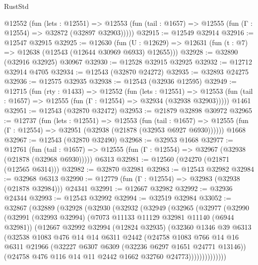 \begin{lexlean}{RustStd}
\begin{coremodule}
    @12552
      (fun (lets : @12551) =>
      @12553 (fun (tail : @1657) => @12555 (fun (Γ : @12554) => @32872 (@32897 @32903)))))
@32915 := @12549 @32914
@32916 := @12547 @32915
@32925 := @12630
    (fun (U : @12629) => @12631 (fun (t : @7) => @12638 (@12543 (@12644 @30969 @6933) @12655)))
@32928 := @32890 (@32916 @32925) @30967
@32930 := @12528 @32915 @32925
@32932 := @12712 @32914 @4705
@32934 := @12543 (@32870 @24272)
@32935 := @32893 @24275
@32936 := @12575 @32935
@32938 := @12543 (@32936 @12595)
@32949 := @12715
    (fun (rty : @1433) =>
    @12552
      (fun (lets : @12551) =>
      @12553 (fun (tail : @1657) => @12555 (fun (Γ : @12554) => @32934 (@32938 @32903)))))
    @1461
@32951 := @12543 (@32870 @32472)
@32953 := @21879 @32898 @30972
@32965 := @12737
    (fun (lets : @12551) =>
    @12553
      (fun (tail : @1657) =>
      @12555 (fun (Γ : @12554) => @32951 (@32938 (@21878 (@32953 @6927 @6930))))))
    @1668
@32967 := @12543 (@32870 @32490)
@32968 := @32953 @1668
@32977 := @12761
    (fun (tail : @1657) => @12555 (fun (Γ : @12554) => @32967 (@32938 (@21878 (@32968 @6930)))))
    @6313
@32981 := @12560 (@24270 (@21871 (@12565 @6314)))
@32982 := @32870 @32981
@32983 := @12543 @32982
@32984 := @32968 @6313
@32990 := @12779 (fun (Γ : @12554) => @32983 (@32938 (@21878 @32984))) @24341
@32991 := @12667 @32982
@32992 := @32936 @24344
@32993 := @12543 @32992
@32994 := @32519 @32984
@33052 := @32867
    (@32889
      (@32928
        (@32930
          (@32932
            (@32949
              (@32965
                (@32977
                  (@32990
                    (@32991
                      (@32993 @32994)
                      (@7073 @11133 @11129 @32981 @11140 (@6944 @32981))
                      (@12667
                        @32992
                        @32994
                        (@12824 @32935)
                        (@32360
                          @1346
                          @39
                          @6313
                          (@32538
                            @1083
                            @476
                            @14
                            @14
                            @6311
                            @2442
                            (@24758
                              @1083
                              @766
                              @14
                              @16
                              @6311
                              @21966
                              (@32227 @6307 @6309 (@32236 @6297 @1651 @24771 @13146))
                              (@24758 @476 @116 @14 @11 @2442 @1662 @32760 @24773))))))))))))))

\end{coremodule}
\end{lexlean}
